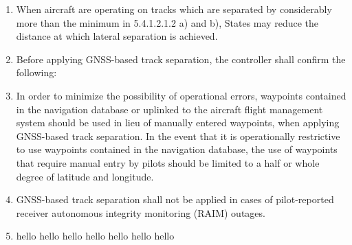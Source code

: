 \begin{enumeratesc}
\begin{enumerate}
\begin{enumerate}

            \begin{enumerate}
                \item When aircraft are operating on tracks which are separated by considerably more than the minimum in 5.4.1.2.1.2 a) and b), States may reduce the distance at which lateral separation is achieved.
                \item Before applying GNSS-based track separation, the controller shall confirm the following:
                \item In order to minimize the possibility of operational errors, waypoints contained in the navigation database or uplinked to the aircraft flight management system should be used in lieu of manually entered waypoints, when applying GNSS-based track separation. In the event that it is operationally restrictive to use waypoints contained in the navigation database, the use of waypoints that require manual entry by pilots should be limited to a half or whole degree of latitude and longitude.
                \item GNSS-based track separation shall not be applied in cases of pilot-reported receiver autonomous integrity monitoring (RAIM) outages.
                \item hello hello hello hello hello hello hello
            \end{enumerate}
            
        \end{enumerate}


    \end{enumerate}
\end{enumeratesc}